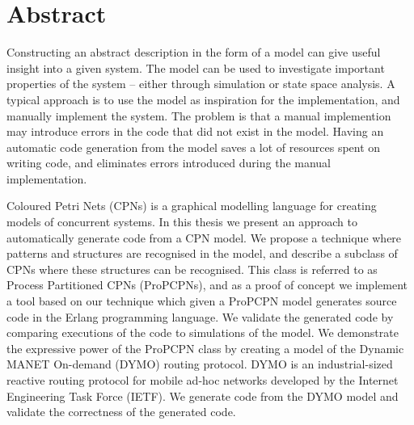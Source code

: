 \chapter*{Abstract}

Constructing an abstract description in the form of a model can give useful insight into a given system. The model can be used to investigate important properties of the system -- either through simulation or state space analysis. A typical approach is to use the model as inspiration for the implementation, and manually implement the system. The problem is that a manual implemention may introduce errors in the code that did not exist in the model. Having an automatic code generation from the model saves a lot of resources spent on writing code, and eliminates errors introduced during the manual implementation. 

Coloured Petri Nets (CPNs) is a graphical modelling language for creating models of concurrent systems. In this thesis we present an approach to automatically generate code from a CPN model. We propose a technique where patterns and structures are recognised in the model, and describe a subclass of CPNs where these structures can be recognised. This class is referred to as Process Partitioned CPNs (ProPCPNs), and as a proof of concept we implement a tool based on our technique which given a ProPCPN model generates source code in the Erlang programming language. We validate the generated code by comparing executions of the code to simulations of the model. We demonstrate the expressive power of the ProPCPN class by creating a model of the Dynamic MANET On-demand (DYMO) routing protocol. DYMO is an industrial-sized reactive routing protocol for mobile ad-hoc networks developed by the Internet Engineering Task Force (IETF). We generate code from the DYMO model and validate the correctness of the generated code.
